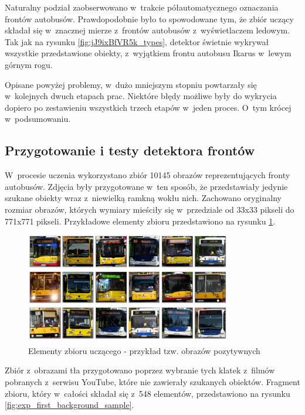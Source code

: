 Naturalny podział zaobserwowano w~trakcie półautomatycznego oznaczania frontów
autobusów. Prawdopodobnie było to spowodowane tym, że zbiór uczący składał
się w~znacznej mierze z~frontów autobusów z~wyświetlaczem ledowym. Tak jak na
rysunku \ref{fig:jJ9ixBfVR5k_types}, detektor świetnie wykrywał wszystkie 
przedstawione obiekty, z~wyjątkiem frontu autobusu Ikarus w~lewym górnym rogu.

Opisane powyżej problemy, w~dużo mniejszym stopniu powtarzały się w~kolejnych 
dwuch etapach prac. Niektóre błędy możliwe były do wykrycia dopiero po
zestawieniu wszystkich trzech etapów w~jeden proces. O~tym krócej w~podsumowaniu.

\subsection{Przygotowanie i testy detektora frontów}

W~procesie uczenia wykorzystano zbiór 10145 obrazów reprezentujących fronty autobusów.
Zdjęcia były przygotowane w~ten sposób, że przedstawiały jedynie szukane obiekty
wraz z~niewielką ramkną wokłu nich. Zachowano oryginalny rozmiar obrazów, których
wymiary mieściły się w~przedziale od 33x33 pikseli do 771x771 pikseli.
Przykładowe elementy zbioru przedstawiono na rysunku \ref{fig:exp_second_crop_sample}.

\begin{figure}[!h]
	\centering
	\includegraphics[width=0.8\textwidth]{img/exp_second_crop_sample}
	\caption{Elementy zbioru uczącego - przykład tzw. obrazów pozytywnych}
	\label{fig:exp_second_crop_sample}
\end{figure}

Zbiór z~obrazami tła
przygotowano poprzez wybranie tych klatek z~filmów pobranych z~serwisu
YouTube, które nie
zawierały szukanych obiektów. Fragment zbioru, który w~całości
składał się z~548 elementów, przedstawiono na rysunku \ref{fig:exp_first_background_sample}.

